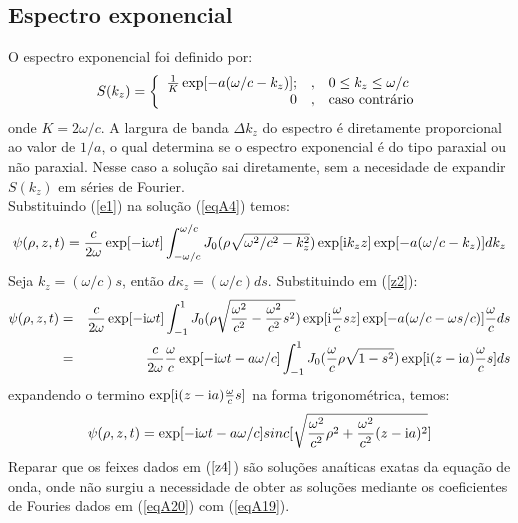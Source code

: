 \subsection{Espectro exponencial} O espectro exponencial foi definido por:
\begin{equation}\label{e1}
S(k_{z})= \left\{
\begin{array}{rcl}
   \frac{1}{K}\exp[-a(\omega /c - k_z )];  & , & 0\leq k_{z}\leq \omega /c\\
     0 &  , & $caso contr\'ario$
\end{array}
\right.
\end{equation}
onde $K=2\omega/c$. A largura de banda $\Delta k_z$ do espectro \'e diretamente proporcional ao valor de $1/a$, o qual determina se o espectro exponencial \'e do tipo paraxial ou n\~ao paraxial. Nesse caso a solu\c{c}\~ao sai diretamente, sem a necesidade de expandir $S(k_z)$ em s\'eries de Fourier.\\
Substituindo (\ref{e1}) na solu\c{c}\~ao (\ref{eqA4}) temos:
\begin{equation}\label{z2}
    \psi(\rho,z,t)= \frac{c}{2\omega}\exp[-{\rm i}\omega t]\int_{-\omega/c}^{\omega/c}J_0(\rho\sqrt{\omega^2/c^2-k_{z}^2})\exp[{\rm i}k_{z}z]\exp[-a(\omega/c-k_{z})]d k_{z}
\end{equation}
Seja $k_{z}=(\omega/c)s$, ent\~ao $d\kappa_{z}=(\omega/c)ds$. Substituindo em (\ref{z2}):
\begin{eqnarray}
\psi(\rho,z,t) &=&\frac{c}{2\omega}\exp[-{\rm i}\omega t]\int_{-1}^{1}J_0(\rho\sqrt{\frac{\omega^2}{c^2}-\frac{\omega^2}{c^2}s^2})\exp[{\rm i}\frac{\omega}{c}s z]\exp[-a(\omega/c-\omega s/c)]\frac{\omega}{c}ds\nonumber\\
 &=&\frac{c}{2\omega} \frac{\omega}{c}\exp[-{\rm i}\omega t-a\omega/c]\int_{-1}^{1}J_0(\frac{\omega}{c}\rho\sqrt{1-s^2})\exp[{\rm i}(z-{\rm i}a)\frac{\omega}{c}s]ds
\label{z3}
\end{eqnarray}
expandendo o termino $\exp[{\rm i}(z-{\rm i}a)\frac{\omega}{c}s]$ na forma trigonom\'etrica, temos:
\begin{equation}\label{z4}
   \psi(\rho,z,t)=\exp[-{\rm i}\omega t-a\omega/c]sinc[\sqrt{\frac{\omega^2}{c^2}\rho^2+\frac{\omega^2}{c^2}(z-{\rm i}a)^2}]
\end{equation}
Reparar que os feixes dados em ($\ref{z4}$) s\~ao solu\c{c}\~oes ana\'iticas exatas da equa\c{c}\~ao de onda, onde n\~ao surgiu a necessidade de obter as solu\c{c}\~oes mediante os coeficientes de Fouries dados em (\ref{eqA20}) com (\ref{eqA19}).\\
